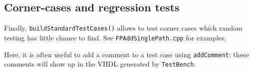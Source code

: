 \documentclass{article}
\begin{document}
\subsection{Corner-cases and regression tests}
Finally, \texttt{\small buildStandardTestCases()} allows to test
corner cases which random testing has little chance to find. See
\texttt{\small FPAddSinglePath.cpp} for examples. 

Here, it is often useful to add
a comment to a test case using \texttt{\small addComment}: these comments
will show up in the VHDL generated by \texttt{\small TestBench}.
\end{document}
